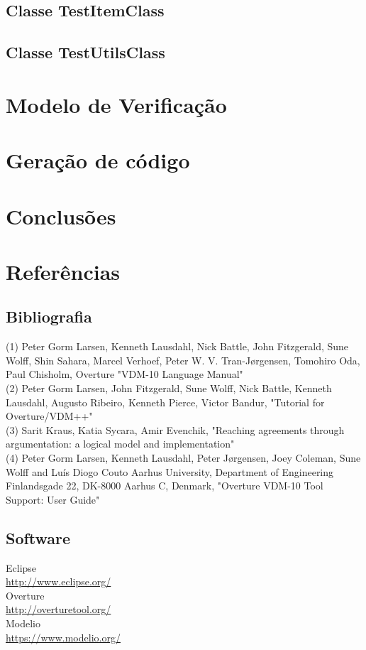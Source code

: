 \documentclass{article}
\begin{document}
\subsection{Classe TestItemClass}


\subsection{Classe TestUtilsClass}


\section{Modelo de Verificação}

\section{Geração de código}

\section{Conclusões}
\section{Referências}
\subsection{Bibliografia}
\noindent
(1) Peter Gorm Larsen, Kenneth Lausdahl, Nick Battle, John Fitzgerald, Sune Wolff, Shin Sahara, Marcel Verhoef, Peter W. V. Tran-Jørgensen, Tomohiro Oda, Paul Chisholm, Overture "VDM-10 Language Manual"\\

\noindent
(2) Peter Gorm Larsen, John Fitzgerald, Sune Wolff, Nick Battle, Kenneth Lausdahl, Augusto Ribeiro, Kenneth Pierce, Victor Bandur, "Tutorial for Overture/VDM++"\\

\noindent
(3) Sarit Kraus, Katia Sycara, Amir Evenchik, "Reaching agreements through argumentation: a logical model and implementation"\\

\noindent
(4) Peter Gorm Larsen, Kenneth Lausdahl, Peter Jørgensen, Joey Coleman, Sune Wolff and Luís Diogo Couto Aarhus University, Department of Engineering Finlandsgade 22, DK-8000 Aarhus C, Denmark, "Overture VDM-10 Tool Support: User Guide"\\
\subsection{Software}

Eclipse \\
\vspace{3mm}\url{http://www.eclipse.org/} \\
Overture \\
\vspace{3mm}\url{http://overturetool.org/} \\
Modelio \\
\vspace{3mm}\url{https://www.modelio.org/} \\
\end{document}
